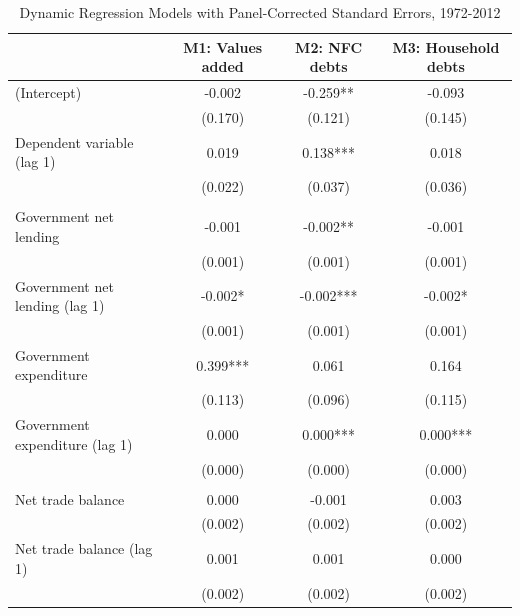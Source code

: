 \documentclass[
]{article}
\begin{document}
\begin{table}

\caption{\label{tab:unnamed-chunk-3}Dynamic Regression Models with Panel-Corrected Standard Errors, 1972-2012}
\centering
\begin{tabular}[t]{lccc}
\toprule
  & M1: Values added & M2: NFC debts & M3: Household debts\\
\midrule
(Intercept) & -0.002 & -0.259** & -0.093\\
 & (0.170) & (0.121) & (0.145)\\
Dependent variable (lag 1) & 0.019 & 0.138*** & 0.018\\
 & (0.022) & (0.037) & (0.036)\\
\addlinespace[0.3em]
\multicolumn{4}{l}{\textbf{Statecraft contigency}}\\
\hspace{1em}Government net lending & -0.001 & -0.002** & -0.001\\
\hspace{1em} & (0.001) & (0.001) & \vphantom{1} (0.001)\\
\hspace{1em}Government net lending (lag 1) & -0.002* & -0.002*** & -0.002*\\
\hspace{1em} & (0.001) & (0.001) & (0.001)\\
\hspace{1em}Government expenditure & 0.399*** & 0.061 & 0.164\\
\hspace{1em} & (0.113) & (0.096) & (0.115)\\
\hspace{1em}Government expenditure (lag 1) & 0.000 & 0.000*** & 0.000***\\
\hspace{1em} & (0.000) & (0.000) & \vphantom{3} (0.000)\\
\addlinespace[0.3em]
\multicolumn{4}{l}{\textbf{Development pitfall}}\\
\hspace{1em}Net trade balance & 0.000 & -0.001 & 0.003\\
\hspace{1em} & (0.002) & (0.002) & \vphantom{2} (0.002)\\
\hspace{1em}Net trade balance (lag 1) & 0.001 & 0.001 & 0.000\\
\hspace{1em} & (0.002) & (0.002) & \vphantom{1} (0.002)\\

\end{tabular}
\end{table}
\end{document}
